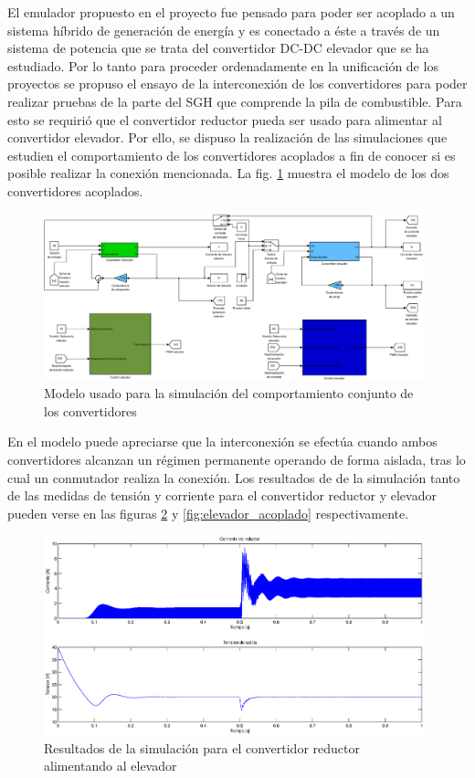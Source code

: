 El emulador propuesto en el proyecto fue pensado para poder ser acoplado a un sistema híbrido de generación de energía y es conectado a éste
a través de un sistema de potencia que se trata del convertidor DC-DC elevador que se ha estudiado. Por lo tanto para proceder ordenadamente 
en la unificación de los proyectos se propuso el ensayo de la interconexión de los convertidores para poder realizar pruebas de la parte
del SGH  que comprende la pila de combustible. Para esto se requirió que el convertidor reductor pueda ser usado para alimentar al convertidor elevador. Por
ello, se dispuso la realización de las simulaciones que estudien el comportamiento de los convertidores acoplados a fin de conocer si
es posible realizar la conexión mencionada. La fig. \ref{fig:modelo_acoplado} muestra el modelo de los dos convertidores acoplados.
\begin{figure}[H]
  \centering
  \includegraphics[width=11cm]{gfx/modelo_acoplado.eps}
  \caption{Modelo usado para la simulación del comportamiento conjunto de los convertidores}
  \label{fig:modelo_acoplado}
\end{figure}
En el modelo puede apreciarse que la interconexión se efectúa cuando ambos convertidores alcanzan un régimen permanente operando de forma
aislada, tras lo cual un conmutador realiza la conexión. Los resultados de de la simulación tanto de las medidas de tensión y corriente para
el convertidor reductor y elevador pueden verse en las figuras \ref{fig:reductor_acoplado} y \ref{fig:elevador_acoplado} respectivamente.
\begin{figure}[H]
  \centering
  \includegraphics[width=11cm]{gfx/reductor_acoplado}
  \caption{Resultados de la simulación para el convertidor reductor alimentando al elevador}
  \label{fig:reductor_acoplado}
\end{figure}



